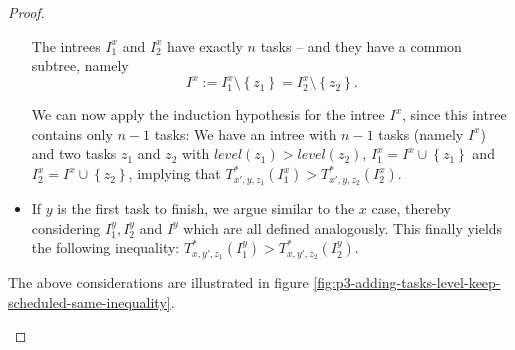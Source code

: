\begin{proof}
\begin{itemize}
    The intrees $I^x_{1}$ and $I^x_{2}$ have exactly $n$ tasks -- and they have a common subtree, namely
    \begin{equation*}
      I^x := I^x_{1}\setminus\left\{ z_1 \right\}=I^x_{2}\setminus\left\{ z_2 \right\}.
    \end{equation*}

    
    We can now apply the induction hypothesis for the intree $I^x$, since this intree contains only $n-1$ tasks: We have an intree with $n-1$ tasks (namely $I^x$) and two tasks $z_1$ and $z_2$ with $level(z_1)>level(z_2)$, $I^x_1 = I^x\cup\left\{ z_1 \right\}$ and $I^x_2 = I^x\cup\left\{ z_2 \right\}$, implying that $T^*_{x',y,z_1}(I^x_1)>T^*_{x',y,z_2}(I^x_{2})$.
  \item If $y$ is the first task to finish, we argue similar to the $x$ case, thereby considering $I^y_{1},I^y_{2}$ and $I^y$ which are all defined analogously. This finally yields the following inequality: $T^*_{x,y',z_1}(I^y_{1}) > T^*_{x,y',z_2}(I^y_{2})$.
  \end{itemize}

  The above considerations are illustrated in figure 
\ref{fig:p3-adding-tasks-level-keep-scheduled-same-inequality}.
  
  \begin{figure}[t]
    \centering
    \newcommand{\drawx}{
      \node[draw=black,circle] at (.9,3) {$x$};
    }
    \newcommand{\drawxx}{
      \node[draw=black,circle] at (.7,2) {$x'$};
    }
    \newcommand{\drawy}{
      \node[draw=black,circle] at (-1.5,4) {$y$};
    }
    \newcommand{\drawyy}{
      \node[draw=black,circle] at (-1.5,3) {$y'$};
    }
    \newcommand{\rawtriangle}{
      \draw
      [dotted, very thick,
      rounded corners]
      (0,0) -- (3,2) -- (3.5,8) -- (-3.5,8) -- (-3,2) -- cycle;
    }
    \newcommand{\treetriangle}{
      \rawtriangle;
      \drawx;
      \drawy;
    }
    \newcommand{\abstand}{7.5cm}
\end{figure}
\end{proof}
